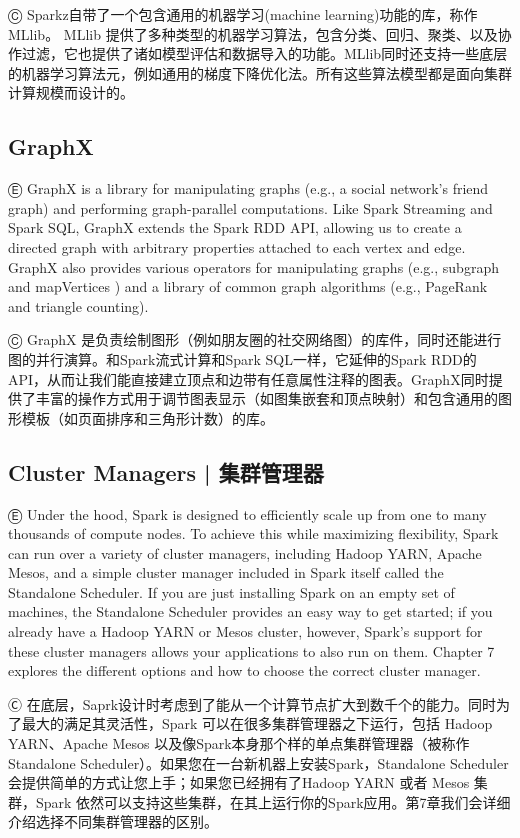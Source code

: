 Ⓒ Sparkz自带了一个包含通用的机器学习(machine learning)功能的库，称作MLlib。 MLlib 提供了多种类型的机器学习算法，包含分类、回归、聚类、以及协作过滤，它也提供了诸如模型评估和数据导入的功能。MLlib同时还支持一些底层的机器学习算法元，例如通用的梯度下降优化法。所有这些算法模型都是面向集群计算规模而设计的。

\subsection{GraphX}\label{graphx}

Ⓔ \textcolor{etc}{GraphX is a library for manipulating graphs (e.g., a social network's friend graph) and performing graph-parallel computations. Like Spark Streaming and Spark SQL, GraphX extends the Spark RDD API, allowing us to create a directed graph with arbitrary properties attached to each vertex and edge. GraphX also provides various operators for manipulating graphs (e.g., subgraph and mapVertices ) and a library of common graph algorithms (e.g., PageRank and triangle counting).}

Ⓒ GraphX 是负责绘制图形（例如朋友圈的社交网络图）的库件，同时还能进行图的并行演算。和Spark流式计算和Spark SQL一样，它延伸的Spark RDD的API，从而让我们能直接建立顶点和边带有任意属性注释的图表。GraphX同时提供了丰富的操作方式用于调节图表显示（如图集嵌套和顶点映射）和包含通用的图形模板（如页面排序和三角形计数）的库。

\subsection{Cluster Managers  |  集群管理器}\label{cluster-managers}

Ⓔ \textcolor{etc}{Under the hood, Spark is designed to efficiently scale up from one to many thousands of compute nodes. To achieve this while maximizing flexibility, Spark can run over a variety of cluster managers, including Hadoop YARN, Apache Mesos, and a simple cluster manager included in Spark itself called the Standalone Scheduler. If you are just installing Spark on an empty set of machines, the Standalone Scheduler provides an easy way to get started; if you already have a Hadoop YARN or Mesos cluster, however, Spark's support for these cluster managers allows your applications to also run on them. Chapter 7 explores the different options and how to choose the correct cluster manager.}

Ⓒ 在底层，Saprk设计时考虑到了能从一个计算节点扩大到数千个的能力。同时为了最大的满足其灵活性，Spark 可以在很多集群管理器之下运行，包括 Hadoop YARN、Apache Mesos 以及像Spark本身那个样的单点集群管理器（被称作 Standalone Scheduler）。如果您在一台新机器上安装Spark，Standalone Scheduler 会提供简单的方式让您上手；如果您已经拥有了Hadoop YARN 或者 Mesos 集群，Spark 依然可以支持这些集群，在其上运行你的Spark应用。第7章我们会详细介绍选择不同集群管理器的区别。

